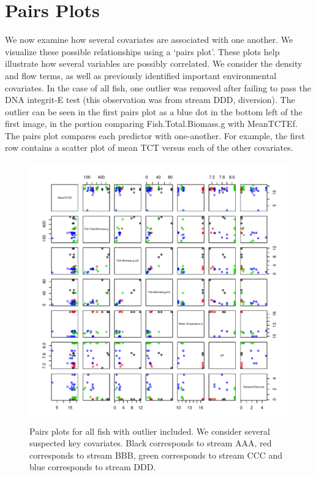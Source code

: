 \section{Pairs Plots}



	We now examine how several covariates are associated with one another. We visualize these possible relationships using a `pairs plot'. These plots help illustrate how several variables are possibly correlated. We consider the density and flow terms, as well as previously identified important environmental covariates.  In the case of all fish, one outlier was removed after failing to pass the DNA integrit-E test (this observation was from stream DDD, diversion). The outlier can be seen in the first pairs plot as a blue dot in the bottom left of the first image, in the portion comparing Fish.Total.Biomass.g with MeanTCTEf. The pairs plot compares each predictor with one-another. For example, the first row contains a scatter plot of mean TCT versus each of the other covariates.



\begin{figure}[H]
\includegraphics{Chapter5Images/EFishpairs_outlierincluded.pdf}
\caption{  \hspace{1mm}  Pairs plots for all fish with outlier included. We consider several suspected key covariates. Black corresponds to stream AAA, red corresponds to stream BBB, green corresponds to stream CCC and blue corresponds to stream DDD.}
\label{fig:pairefoi}
\end{figure}




